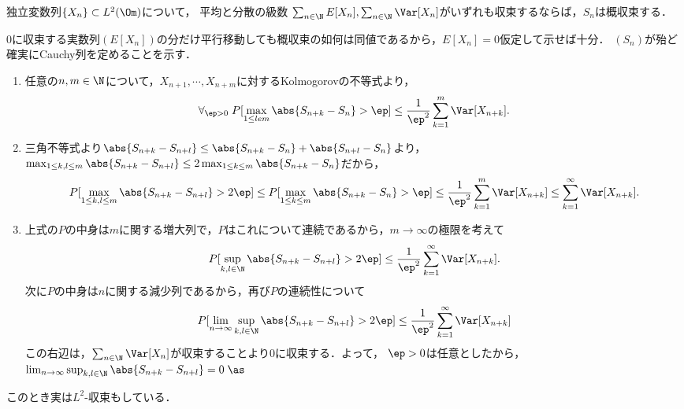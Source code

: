 \documentclass[uplatex,dvipdfmx]{jsreport}
\begin{document}
\begin{theorem}[Kolmogorov]
    独立変数列$\{X_n\}\subset L^2(\Om)$について，
    平均と分散の級数
    $\sum_{n\in\N}E[X_n],\sum_{n\in\N}\Var[X_n]$がいずれも収束するならば，$S_n$は概収束する．
\end{theorem}
\begin{Proof}
    $0$に収束する実数列$(E[X_n])$の分だけ平行移動しても概収束の如何は同値であるから，$E[X_n]=0$仮定して示せば十分．
    $(S_n)$が殆ど確実にCauchy列を定めることを示す．
    \begin{enumerate}
        \item 任意の$n,m\in\N$について，$X_{n+1},\cdots,X_{n+m}$に対するKolmogorovの不等式より，
        \[\forall_{\ep>0}\;P[\max_{1\le le m}\abs{S_{n+k}-S_{n}}>\ep]\le\frac{1}{\ep^2}\sum^m_{k=1}\Var[X_{n+k}].\]
        \item 三角不等式より$\abs{S_{n+k}-S_{n+l}}\le\abs{S_{n+k}-S_n}+\abs{S_{n+l}-S_n}$より，$\max_{1\le k,l\le m}\abs{S_{n+k}-S_{n+l}}\le 2\max_{1\le k\le m}\abs{S_{n+k}-S_n}$だから，
        \[P[\max_{1\le k,l\le m}\abs{S_{n+k}-S_{n+l}}>2\ep]\le P[\max_{1\le k\le m}\abs{S_{n+k}-S_n}>\ep]\le\frac{1}{\ep^2}\sum_{k=1}^m\Var[X_{n+k}]\le\sum_{k=1}^\infty\Var[X_{n+k}].\]
        \item 上式の$P$の中身は$m$に関する増大列で，$P$はこれについて連続であるから，$m\to\infty$の極限を考えて
        \[P[\sup_{k,l\in\N}\abs{S_{n+k}-S_{n+l}}>2\ep]\le\frac{1}{\ep^2}\sum^\infty_{k=1}\Var[X_{n+k}].\]
        次に$P$の中身は$n$に関する減少列であるから，再び$P$の連続性について
        \[P[\lim_{n\to\infty}\sup_{k,l\in\N}\abs{S_{n+k}-S_{n+l}}>2\ep]\le\frac{1}{\ep^2}\sum^\infty_{k=1}\Var[X_{n+k}]\]
        この右辺は，$\sum_{n\in\N}\Var[X_n]$が収束することより$0$に収束する．よって，
        $\ep>0$は任意としたから，$\lim_{n\to\infty}\sup_{k,l\in\N}\abs{S_{n+k}-S_{n+l}}=0\;\as$
    \end{enumerate}
\end{Proof}
\begin{remarks}
    このとき実は$L^2$-収束もしている．
\end{remarks}
\end{document}
